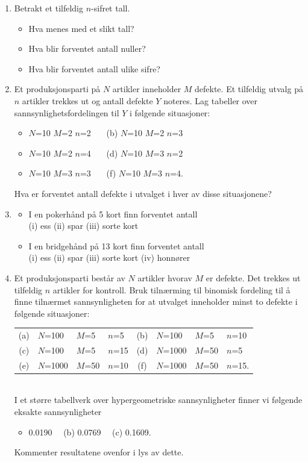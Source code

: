 \begin{enumerate}
\item Betrakt et tilfeldig $n$-sifret tall.
     \begin{itemize}
     \item[(a)]  Hva menes med et slikt tall?
     \item[(b)]  Hva blir forventet antall nuller?
     \item[(c)]  Hva blir forventet antall ulike sifre?
     \end{itemize}

\item Et produksjonsparti på $N$ artikler inneholder $M$ defekte.
     Et tilfeldig utvalg på $n$ artikler trekkes ut og antall
     defekte $Y$ noteres. Lag tabeller over
     sannsynlighetsfordelingen til $Y$ i følgende situasjoner:
     \begin{itemize}
     \item[(a)]  $N$=10 $M$=2 $n$=2 \ \ \ (b)  $N$=10 $M$=2 $n$=3
     \item[(c)]  $N$=10 $M$=2 $n$=4 \ \ \ (d)  $N$=10 $M$=3 $n$=2
     \item[(e)]  $N$=10 $M$=3 $n$=3 \ \ \ (f)  $N$=10 $M$=3 $n$=4.
     \end{itemize}
      Hva er forventet antall defekte i utvalget i hver av disse
     situasjonene?
\item  \begin{itemize}
     \item[(a)]  I en pokerhånd på 5 kort finn forventet antall \\
          (i) ess (ii) spar (iii) sorte kort
     \item[(b)]  I en bridgehånd på 13 kort finn forventet antall \\
          (i) ess (ii) spar (iii) sorte kort (iv) honnører
     \end{itemize}

\item Et produksjonsparti består av $N$ artikler hvorav $M$ er
     defekte. Det trekkes ut tilfeldig $n$ artikler for kontroll.
     Bruk tilnærming til binomisk fordeling til å finne tilnærmet
     sannsynligheten for at utvalget inneholder minst to defekte
     i følgende situasjoner:\\
     \begin{tabular}{clllclll}
     (a) &  $N$=100& $M$=5 & $n$=5 & (b) & $N$=100 & $M$=5 & $n$=10 \\
     (c) &  $N$=100& $M$=5 & $n$=15& (d) & $N$=1000& $M$=50& $n$=5 \\
     (e) &  $N$=1000&$M$=50& $n$=10& (f) & $N$=1000& $M$=50& $n$=15.
     \end{tabular} \\
     I et større tabellverk over hypergeometriske sannsynligheter
     finner vi følgende eksakte sannsynligheter
     \begin{itemize}
     \item[(a)]  0.0190 \ \   (b)  0.0769 \ \     (c) 0.1609.
     \end{itemize}
     Kommenter resultatene ovenfor i lys av dette.


\end{enumerate}
